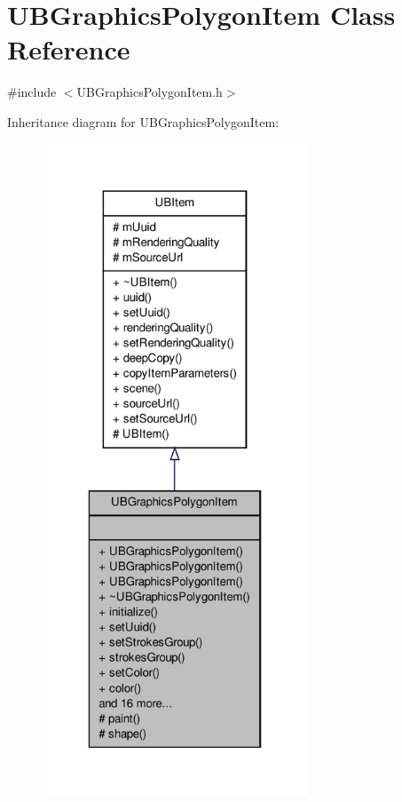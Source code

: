 \hypertarget{class_u_b_graphics_polygon_item}{\section{U\-B\-Graphics\-Polygon\-Item Class Reference}
\label{d5/d46/class_u_b_graphics_polygon_item}
}


{\ttfamily \#include $<$U\-B\-Graphics\-Polygon\-Item.\-h$>$}



Inheritance diagram for U\-B\-Graphics\-Polygon\-Item\-:
\nopagebreak
\begin{figure}[H]
\begin{center}
\leavevmode
\includegraphics[height=550pt]{dc/d68/class_u_b_graphics_polygon_item__inherit__graph}
\end{center}
\end{figure}


